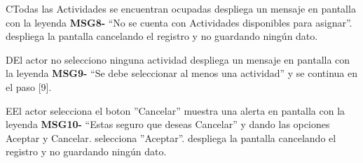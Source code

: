 \begin{UCtrayectoriaA}{C}{Todas las Actividades se encuentran ocupadas}
		   \UCpaso despliega un mensaje en pantalla con la leyenda {\bf MSG8-} “No se cuenta con Actividades disponibles para asignar”.
		   \UCpaso despliega la pantalla  cancelando el registro y no guardando ningún dato.
\end{UCtrayectoriaA}
\begin{UCtrayectoriaA}{D}{El actor no selecciono ninguna actividad}
		   \UCpaso despliega un mensaje en pantalla con la leyenda {\bf MSG9-} “Se debe seleccionar al menos una actividad” y se continua en el paso [9].	  
\end{UCtrayectoriaA}
\begin{UCtrayectoriaA}{E}{El actor selecciona el boton ''Cancelar''}
		   \UCpaso muestra una alerta en pantalla con la leyenda {\bf MSG10-} “Estas seguro que deseas Cancelar” y dando las opciones Aceptar y Cancelar.
		   \UCpaso[\UCactor] selecciona ''Aceptar''.
		   \UCpaso despliega la pantalla cancelando el registro y no guardando ningún dato.
\end{UCtrayectoriaA}




